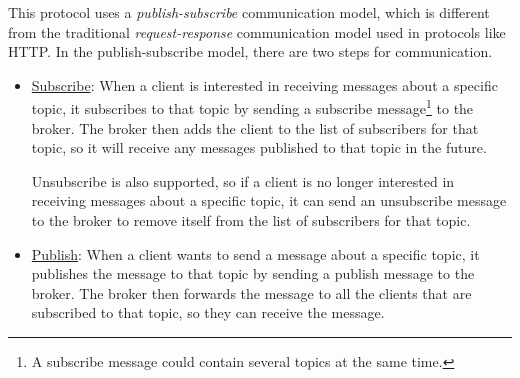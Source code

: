 This protocol uses a \emph{publish-subscribe} communication model, which is different from the traditional \emph{request-response} communication model used in protocols like HTTP. In the publish-subscribe model, there are two steps for communication.
\begin{itemize}
    \item \ul{Subscribe}: When a client is interested in receiving messages about a specific topic, it subscribes to that topic by sending a subscribe message\footnote{A subscribe message could contain several topics at the same time.} to the broker. The broker then adds the client to the list of subscribers for that topic, so it will receive any messages published to that topic in the future.
    
    Unsubscribe is also supported, so if a client is no longer interested in receiving messages about a specific topic, it can send an unsubscribe message to the broker to remove itself from the list of subscribers for that topic.
    \item \ul{Publish}: When a client wants to send a message about a specific topic, it publishes the message to that topic by sending a publish message to the broker. The broker then forwards the message to all the clients that are subscribed to that topic, so they can receive the message.
    

\end{itemize}
